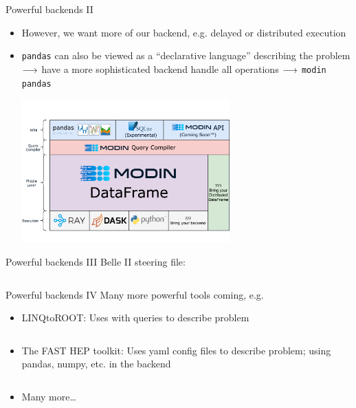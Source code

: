\begin{frame}{Powerful backends II}
	\begin{itemize}
		\item However, we want more of our backend, e.g. delayed or distributed execution
		\item \texttt{pandas} can also be viewed as a \enquote{declarative language} describing the problem $\longrightarrow$ have a more sophisticated backend handle all operations $\longrightarrow$ \texttt{modin pandas}
		
		\includegraphics[width=8cm, trim=0cm 2.5cm 0cm 2.5cm, clip]{figures/paradigms/dp/modin_architecture.png}
	\end{itemize}
\end{frame}
%
\begin{frame}{Powerful backends III}
	Belle II steering file:
	\inputminted{python}{code/paradigms/dp/belle2_steering_file.py}
\end{frame}
%
\begin{frame}{Powerful backends IV}
	Many more powerful tools coming, e.g.
	\smallskip 
	\begin{itemize}
		\item LINQtoROOT: Uses  with  queries to describe problem
		\inputminted[fontsize=\small]{csharp}{code/paradigms/dp/linqtoroot.cs}
		\item The FAST HEP toolkit: Uses yaml config files to describe problem; using pandas, numpy, etc. in the backend
		\inputminted[fontsize=\small]{yaml}{code/paradigms/dp/fast.yaml}
		\item Many more\dots
	\end{itemize}
\end{frame}